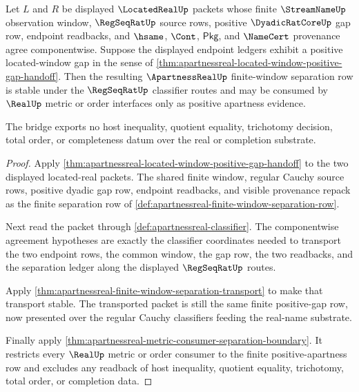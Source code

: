 \begin{theorem}
\label{thm:localized-cauchy-apartness-bridge}
Let $L$ and $R$ be displayed $\LocatedRealUp$ packets whose finite $\StreamNameUp$ observation window, $\RegSeqRatUp$ source rows, positive $\DyadicRatCoreUp$ gap row, endpoint readbacks, and $\hsame$, $\Cont$, $\mathsf{Pkg}$, and $\NameCert$ provenance agree componentwise. Suppose the displayed endpoint ledgers exhibit a positive located-window gap in the sense of \autoref{thm:apartnessreal-located-window-positive-gap-handoff}. Then the resulting $\ApartnessRealUp$ finite-window separation row is stable under the $\RegSeqRatUp$ classifier routes and may be consumed by $\RealUp$ metric or order interfaces only as positive apartness evidence.

The bridge exports no host inequality, quotient equality, trichotomy decision, total order, or completeness datum over the real or completion substrate.
\end{theorem}
\begin{proof}
Apply \autoref{thm:apartnessreal-located-window-positive-gap-handoff} to the two displayed located-real packets. The shared finite window, regular Cauchy source rows, positive dyadic gap row, endpoint readbacks, and visible provenance repack as the finite separation row of \autoref{def:apartnessreal-finite-window-separation-row}.

Next read the packet through \autoref{def:apartnessreal-classifier}. The componentwise agreement hypotheses are exactly the classifier coordinates needed to transport the two endpoint rows, the common window, the gap row, the two readbacks, and the separation ledger along the displayed $\RegSeqRatUp$ routes.

Apply \autoref{thm:apartnessreal-finite-window-separation-transport} to make that transport stable. The transported packet is still the same finite positive-gap row, now presented over the regular Cauchy classifiers feeding the real-name substrate.

Finally apply \autoref{thm:apartnessreal-metric-consumer-separation-boundary}. It restricts every $\RealUp$ metric or order consumer to the finite positive-apartness row and excludes any readback of host inequality, quotient equality, trichotomy, total order, or completion data.
\end{proof}


